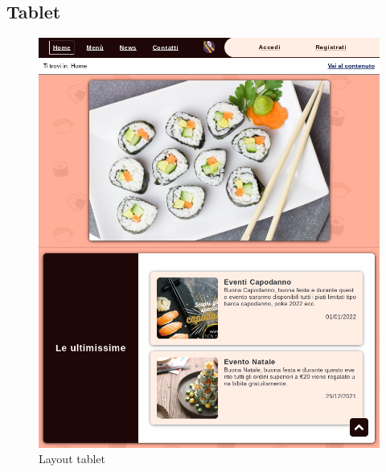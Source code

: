 \documentclass{template}
\begin{document}
	\subsection{Tablet}
	\begin{figure}[H]
		\centering
		\includegraphics[scale=0.5]{src/layout/tablet.png}
		\caption{Layout tablet}
	\end{figure}
\end{document}
